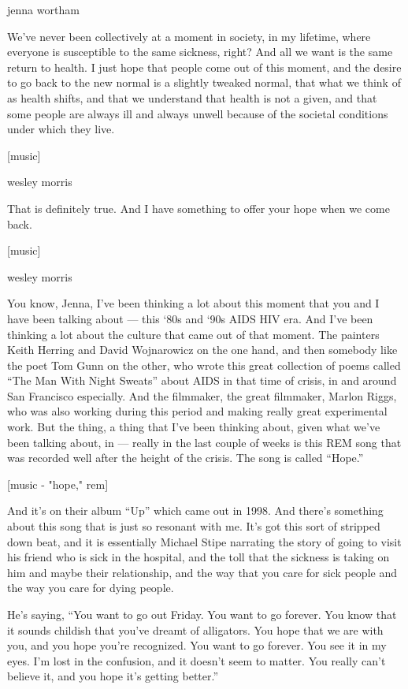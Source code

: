 jenna wortham

We've never been collectively at a moment in society, in my lifetime,
where everyone is susceptible to the same sickness, right? And all we
want is the same return to health. I just hope that people come out of
this moment, and the desire to go back to the new normal is a slightly
tweaked normal, that what we think of as health shifts, and that we
understand that health is not a given, and that some people are always
ill and always unwell because of the societal conditions under which
they live.

{[}music{]}

wesley morris

That is definitely true. And I have something to offer your hope when we
come back.

{[}music{]}

wesley morris

You know, Jenna, I've been thinking a lot about this moment that you and
I have been talking about --- this `80s and `90s AIDS HIV era. And I've
been thinking a lot about the culture that came out of that moment. The
painters Keith Herring and David Wojnarowicz on the one hand, and then
somebody like the poet Tom Gunn on the other, who wrote this great
collection of poems called ``The Man With Night Sweats'' about AIDS in
that time of crisis, in and around San Francisco especially. And the
filmmaker, the great filmmaker, Marlon Riggs, who was also working
during this period and making really great experimental work. But the
thing, a thing that I've been thinking about, given what we've been
talking about, in --- really in the last couple of weeks is this REM
song that was recorded well after the height of the crisis. The song is
called ``Hope.''

{[}music - "hope," rem{]}

And it's on their album ``Up'' which came out in 1998. And there's
something about this song that is just so resonant with me. It's got
this sort of stripped down beat, and it is essentially Michael Stipe
narrating the story of going to visit his friend who is sick in the
hospital, and the toll that the sickness is taking on him and maybe
their relationship, and the way that you care for sick people and the
way you care for dying people.

He's saying, ``You want to go out Friday. You want to go forever. You
know that it sounds childish that you've dreamt of alligators. You hope
that we are with you, and you hope you're recognized. You want to go
forever. You see it in my eyes. I'm lost in the confusion, and it
doesn't seem to matter. You really can't believe it, and you hope it's
getting better.''

